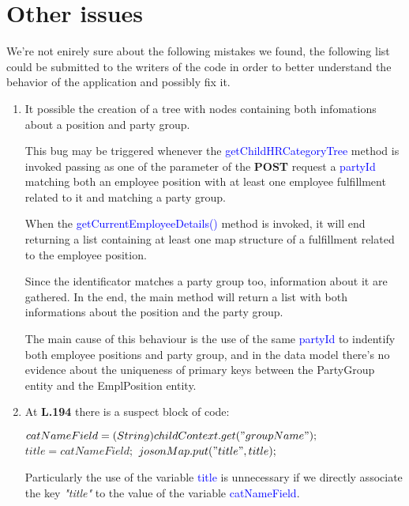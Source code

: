 \section{Other issues}

We're not enirely sure about the following mistakes we found, the following list
could be submitted to the writers of the code in order to better understand the
behavior of the application and possibly fix it.

\begin{enumerate}
	\item It possible the creation of a tree with nodes containing both
	infomations about a position and party group.

	This bug may be triggered whenever the
	\textcolor{blue}{getChildHRCategoryTree} method is invoked passing as one of
	the parameter of the \textbf{POST} request a \textcolor{blue}{partyId}
	matching both an employee position with at least one employee fulfillment
	related to it and matching a party group.

	When the \textcolor{blue}{getCurrentEmployeeDetails()} method is invoked, it
	will end returning a list containing at least one map structure of a
	fulfillment related to the employee position.

	Since the identificator matches a party group too, information about it are
	gathered. In the end, the main method will return a list with both
	informations about the position and the party group.

	The main cause of this behaviour is the use of the same
	\textcolor{blue}{partyId} to indentify both employee positions and party
	group, and in the data model there's no evidence about the uniqueness of
	primary keys between the PartyGroup entity and the EmplPosition entity.

	\item At \textbf{L.194} there is a suspect block of code:
		\begin{algorithm}
		\begin{algorithmic}[1]
		\setcounter{ALG@line}{193}

			\State $ catNameField = (String) childContext.get("groupName"); $
			\State $ title = catNameField; $
			\State $ josonMap.put("title",title); $

		\end{algorithmic}
		\end{algorithm}

		Particularly the use of the variable \textcolor{blue}{title} is unnecessary if
		we directly associate the key \textit{"title"} to the value of the variable
		\textcolor{blue}{catNameField}.


\end{enumerate}
